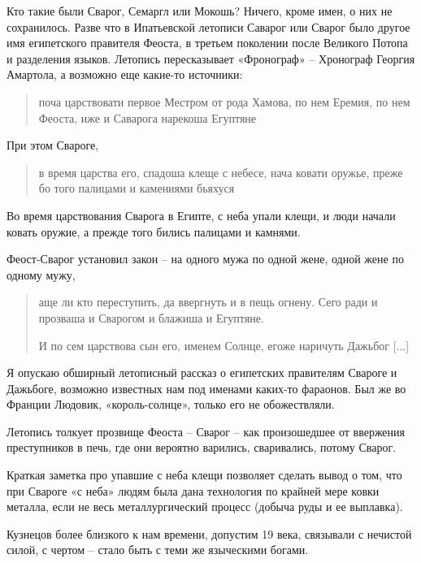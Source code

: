 Кто такие были Сварог, Семаргл или Мокошь? Ничего, кроме имен, о них не сохранилось. Разве что в Ипатьевской летописи Саварог или Сварог было другое имя египетского правителя Феоста, в третьем поколении после Великого Потопа и разделения языков. Летопись пересказывает «Фронограф» – Хронограф Георгия Амартола, а возможно еще какие-то источники:

\begin{quotation}
поча царствовати первое Местром от рода Хамова, по нем Еремия, по нем Феоста, иже и Саварога нарекоша Егуптяне
\end{quotation}

При этом Свароге, 

\begin{quotation}
в время царства его, спадоша клеще с небесе, нача ковати оружье, преже бо того палицами и камениями бьяхуся
\end{quotation}

Во время царствования Сварога в Египте, с неба упали клещи, и люди начали ковать оружие, а прежде того бились палицами и камнями.

Феост-Сварог установил закон – на одного мужа по одной жене, одной жене по одному мужу,

\begin{quotation}
аще ли кто переступить, да ввергнуть и в пещь огнену. Сего ради и прозваша и Сварогом и блажиша и Егуптяне.

И по сем царствова сын его, именем Солнце, егоже наричуть Дажьбог [...]
\end{quotation} 

Я опускаю обширный летописный рассказ о египетских правителям Свароге и Дажьбоге, возможно известных нам под именами каких-то фараонов. Был же во Франции Людовик, «король-солнце», только его не обожествляли.

Летопись толкует прозвище Феоста – Сварог – как произошедшее от ввержения преступников в печь, где они вероятно варились, сваривались, потому Сварог.

Краткая заметка про упавшие с неба клещи позволяет сделать вывод о том, что при Свароге «с неба» людям была дана технология по крайней мере ковки металла, если не весь металлургический процесс (добыча руды и ее выплавка).

Кузнецов более близкого к нам времени, допустим 19 века, связывали с нечистой силой, с чертом – стало быть с теми же языческими богами.

